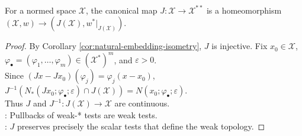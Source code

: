 \begin{proposition} \label{prop:natural-embedding-weak-homeomorphism} \\
For a normed space $\mathcal{X}$, the canonical map $J:\mathcal{X}\to\mathcal{X}^{**}$ is a homeomorphism $(\mathcal X,w)\to(J(\mathcal X),w^*|_{J(\mathcal X)})$.
\begin{proof}
By Corollary \ref{cor:natural-embedding-isometry}, $J$ is injective. Fix $x_0\in\mathcal X$, $\varphi_\bullet=(\varphi_1,\ldots,\varphi_m)\in(\mathcal X^*)^m$, and $\varepsilon>0$.\\
Since $(Jx-Jx_0)(\varphi_j)=\varphi_j(x-x_0)$, $J^{-1}(N_*(Jx_0;\varphi_\bullet;\varepsilon)\cap J(\mathcal X))=N(x_0;\varphi_\bullet;\varepsilon)$.\\
Thus $J$ and $J^{-1}:J(\mathcal X)\to\mathcal X$ are continuous.\\
: Pullbacks of weak-* tests are weak tests.\\
: $J$ preserves precisely the scalar tests that define the weak topology.
\end{proof}
\end{proposition}

